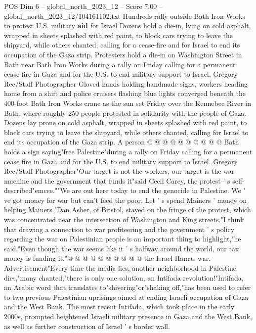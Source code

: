\begin{textsample}{POS Dim 6 – global\_north\_2023\_12 – Score 7.00 – global\_north\_2023\_12/104161102.txt}  \label{ex:f6_pos_190}
Hundreds rally outside Bath Iron Works to protest U.S. military \textbf{aid} for Israel Dozens hold a die-in, lying on cold asphalt, wrapped in sheets splashed with red paint, to block cars trying to leave the shipyard, while others chanted, calling for a cease-fire and for Israel to end its occupation of the Gaza strip.
Protesters hold a die-in on Washington Street in Bath near Bath Iron Works during a rally on Friday calling for a permanent cease fire in Gaza and for the U.S. to end military support to Israel.
Gregory Rec/Staff Photographer Gloved hands holding handmade signs, workers heading home from a shift and police cruisers flashing blue lights converged beneath the 400-foot Bath Iron Works crane as the sun set Friday over the Kennebec River in Bath, where roughly 250 people protested in solidarity with the people of Gaza.
Dozens lay prone on cold asphalt, wrapped in sheets splashed with red paint, to block cars trying to leave the shipyard, while others chanted, calling for Israel to end its occupation of the Gaza strip.
A person @ @ @ @ @ @ @ @ @ @ Bath holds a sign saying"free Palestine"during a rally on Friday calling for a permanent cease fire in Gaza and for the U.S. to end military support to Israel.
Gregory Rec/Staff Photographer"Our target is not the workers, our target is the war machine and the government that funds it"said Cecil Carey, the protest ' s self-described"emcee.""We are out here today to end the genocide in Palestine.
We ' ve got money for war but can't feed the poor.
Let ' s spend Mainers ' money on helping Mainers."Dan Asher, of Bristol, stayed on the fringe of the protest, which was concentrated near the intersection of Washington and King streets."I think that drawing a connection to war profiteering and the government ' s policy regarding the war on Palestinian people is an important thing to highlight,"he said."Even though the war seems like it ' s halfway around the world, our tax money is funding it."@ @ @ @ @ @ @ @ @ @ the Israel-Hamas war.
Advertisement"Every time the media lies, another neighborhood in Palestine dies,"many chanted,"there is only one solution, an Intifada revolution!"Intifada, an Arabic word that translates to"shivering"or"shaking off,"has been used to refer to two previous Palestinian uprisings aimed at ending Israeli occupation of Gaza and the West Bank.
The most recent Intifada, which took place in the early 2000s, prompted heightened Israeli military presence in Gaza and the West Bank, as well as further construction of Israel ' s border wall.

\end{textsample}
